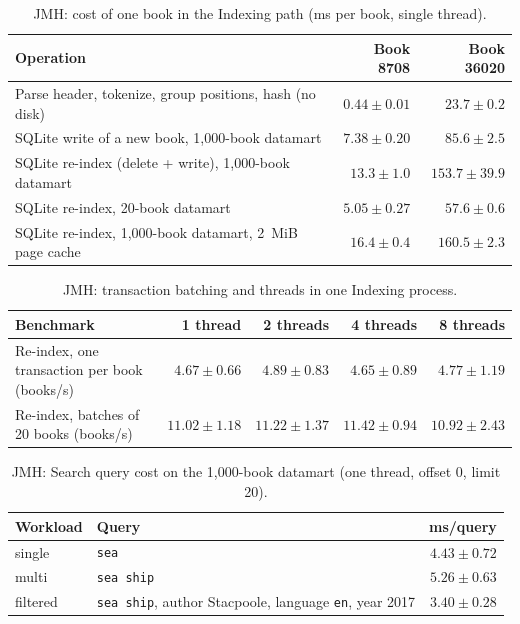\documentclass[12pt,a4paper]{article}
\begin{document}
\begin{table}[H]
    \centering
    \caption{JMH: cost of one book in the Indexing path (ms per book, single thread).}
    \label{tab:jmh-indexing}
    \small
    \begin{tabularx}{\textwidth}{X r r}
        \toprule
        \textbf{Operation} & \textbf{Book 8708} & \textbf{Book 36020} \\
        \midrule
        Parse header, tokenize, group positions, hash (no disk) & $0.44 \pm 0.01$ & $23.7 \pm 0.2$ \\
        SQLite write of a new book, 1,000-book datamart & $7.38 \pm 0.20$ & $85.6 \pm 2.5$ \\
        SQLite re-index (delete + write), 1,000-book datamart & $13.3 \pm 1.0$ & $153.7 \pm 39.9$ \\
        SQLite re-index, 20-book datamart & $5.05 \pm 0.27$ & $57.6 \pm 0.6$ \\
        SQLite re-index, 1,000-book datamart, 2~MiB page cache & $16.4 \pm 0.4$ & $160.5 \pm 2.3$ \\
        \bottomrule
    \end{tabularx}
\end{table}

\begin{table}[H]
    \centering
    \caption{JMH: transaction batching and threads in one Indexing process.}
    \label{tab:jmh-throughput}
    \small
    \begin{tabularx}{\textwidth}{X r r r r}
        \toprule
        \textbf{Benchmark} & \textbf{1 thread} & \textbf{2 threads} & \textbf{4 threads} & \textbf{8 threads} \\
        \midrule
        Re-index, one transaction per book (books/s) & $4.67 \pm 0.66$ & $4.89 \pm 0.83$ & $4.65 \pm 0.89$ & $4.77 \pm 1.19$ \\
        Re-index, batches of 20 books (books/s) & $11.02 \pm 1.18$ & $11.22 \pm 1.37$ & $11.42 \pm 0.94$ & $10.92 \pm 2.43$ \\
        \bottomrule
    \end{tabularx}
\end{table}

\begin{table}[H]
    \centering
    \caption{JMH: Search query cost on the 1,000-book datamart (one thread, offset 0, limit 20).}
    \label{tab:jmh-search}
    \small
    \begin{tabular}{l l r}
        \toprule
        \textbf{Workload} & \textbf{Query} & \textbf{ms/query} \\
        \midrule
        single & \texttt{sea} & $4.43 \pm 0.72$ \\
        multi & \texttt{sea ship} & $5.26 \pm 0.63$ \\
        filtered & \texttt{sea ship}, author Stacpoole, language \texttt{en}, year 2017 & $3.40 \pm 0.28$ \\
        \bottomrule
    \end{tabular}
\end{table}
\end{document}
